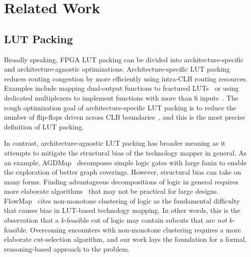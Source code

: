 \section{Related Work}\label{sec:relatedwork}
\subsection{LUT Packing}\label{sec:relatedwork:fpga}
Broadly speaking, FPGA LUT packing can be divided into architecture-specific
and architecture-agnostic optimizations. Architecture-specific LUT packing
reduces routing congestion by more efficiently using intra-CLB routing
resources. Examples include mapping dual-output functions to fractured
LUTs~\cite{fraclut} or using dedicated multiplexers to implement functions with
more than 6 inputs~\cite{ug574}. The rough optimization goal of
architecture-specific LUT packing is to reduce the number of flip-flops driven
across CLB boundaries~\cite{ffpack}, and this is the most precise definition of
LUT packing.

In contrast, architecture-agnostic LUT packing has broader meaning as it
attempts to mitigate the structural bias of the technology mapper in general.
As an example, AGDMap~\cite{adaptdecomp} decomposes simple logic gates with
large fanin to enable the exploration of better graph coverings. However,
structural bias can take on many forms. Finding advantageous decompositions of
logic in general requires more elaborate algorithms~\cite{dsd} that may not be
practical for large designs. FlowMap~\cite{flowmap} cites non-monotone
clustering of logic as the fundamental difficulty that causes bias in LUT-based
technology mapping. In other words, this is the observation that a $k$-feasible
cut of logic may contain subcuts that are \textit{not} $k$-feasible. Overcoming
encounters with non-monotone clustering requires a more elaborate cut-selection
algorithm, and our work lays the foundation for a formal, reasoning-based
approach to the problem.

